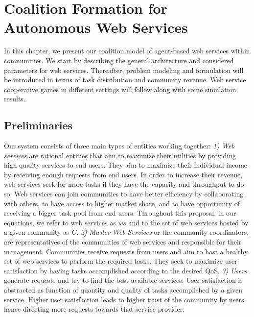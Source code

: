 \setcounter{chapter}{2}

\chapter{Coalition Formation for Autonomous Web Services}\label{sec:coalitionformationws}

In this chapter, we present our coalition model of agent-based web
services within communities\cite{SCC2013efficient}. We start by describing the general
architecture and considered parameters for web services.
Thereafter, problem modeling and formulation will be introduced in
terms of task distribution and community revenue. Web service
cooperative games in different settings will follow along with
some simulation results.

\section{Preliminaries}\label{s:preliminaries}

Our system consists of three main types of entities working
together: \emph{1) Web services} are rational entities that aim to maximize
their utilities by providing high quality services to end users.
They aim to maximize their individual income by receiving enough
requests from end users. In order to increase their revenue, web
services seek for more tasks if they have the capacity and
throughput to do so. Web services can join communities to have
better efficiency by collaborating with others, to have access to
higher market share, and to have opportunity of receiving a bigger
task pool from end users. Throughout this proposal, in our
equations, we refer to web services as $ws$ and to the set of web
services hosted by a given community as $C$. 
\emph{2) Master Web Services} or the community coordinators, are representatives of the
communities of web services and responsible for their management.
Communities receive requests from users and aim to host a healthy
set of web services to perform the required tasks. They seek to
maximize user satisfaction by having tasks accomplished according
to the desired QoS. 
\emph{3) Users} generate requests and try to find the best
available services. User satisfaction is abstracted as function of
quantity and quality of tasks accomplished by a given service.
Higher user satisfaction leads to higher trust of the community by users hence directing more requests towards that service provider.

